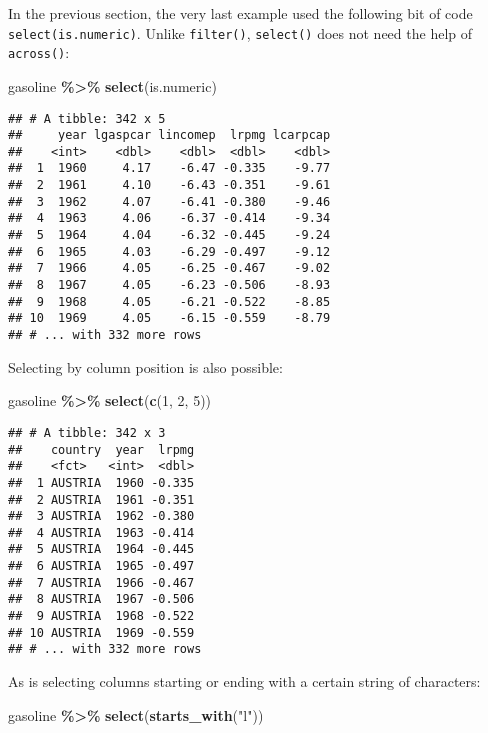 \documentclass[
]{article}
\newenvironment{Shaded}{\begin{snugshade}}{\end{snugshade}}
\newcommand{\DecValTok}[1]{\textcolor[rgb]{0.00,0.00,0.81}{#1}}
\newcommand{\KeywordTok}[1]{\textcolor[rgb]{0.13,0.29,0.53}{\textbf{#1}}}
\newcommand{\NormalTok}[1]{#1}
\newcommand{\OperatorTok}[1]{\textcolor[rgb]{0.81,0.36,0.00}{\textbf{#1}}}
\newcommand{\StringTok}[1]{\textcolor[rgb]{0.31,0.60,0.02}{#1}}
\begin{document}
In the previous section, the very last example used the following bit of code \texttt{select(is.numeric)}.
Unlike \texttt{filter()}, \texttt{select()} does not need the help of \texttt{across()}:

\begin{Shaded}
\begin{Highlighting}[]
\NormalTok{gasoline }\OperatorTok{\%\textgreater{}\%}
\StringTok{  }\KeywordTok{select}\NormalTok{(is.numeric)}
\end{Highlighting}
\end{Shaded}

\begin{verbatim}
## # A tibble: 342 x 5
##     year lgaspcar lincomep  lrpmg lcarpcap
##    <int>    <dbl>    <dbl>  <dbl>    <dbl>
##  1  1960     4.17    -6.47 -0.335    -9.77
##  2  1961     4.10    -6.43 -0.351    -9.61
##  3  1962     4.07    -6.41 -0.380    -9.46
##  4  1963     4.06    -6.37 -0.414    -9.34
##  5  1964     4.04    -6.32 -0.445    -9.24
##  6  1965     4.03    -6.29 -0.497    -9.12
##  7  1966     4.05    -6.25 -0.467    -9.02
##  8  1967     4.05    -6.23 -0.506    -8.93
##  9  1968     4.05    -6.21 -0.522    -8.85
## 10  1969     4.05    -6.15 -0.559    -8.79
## # ... with 332 more rows
\end{verbatim}

Selecting by column position is also possible:

\begin{Shaded}
\begin{Highlighting}[]
\NormalTok{gasoline }\OperatorTok{\%\textgreater{}\%}
\StringTok{  }\KeywordTok{select}\NormalTok{(}\KeywordTok{c}\NormalTok{(}\DecValTok{1}\NormalTok{, }\DecValTok{2}\NormalTok{, }\DecValTok{5}\NormalTok{))}
\end{Highlighting}
\end{Shaded}

\begin{verbatim}
## # A tibble: 342 x 3
##    country  year  lrpmg
##    <fct>   <int>  <dbl>
##  1 AUSTRIA  1960 -0.335
##  2 AUSTRIA  1961 -0.351
##  3 AUSTRIA  1962 -0.380
##  4 AUSTRIA  1963 -0.414
##  5 AUSTRIA  1964 -0.445
##  6 AUSTRIA  1965 -0.497
##  7 AUSTRIA  1966 -0.467
##  8 AUSTRIA  1967 -0.506
##  9 AUSTRIA  1968 -0.522
## 10 AUSTRIA  1969 -0.559
## # ... with 332 more rows
\end{verbatim}

As is selecting columns starting or ending with a certain string of characters:

\begin{Shaded}
\begin{Highlighting}[]
\NormalTok{gasoline }\OperatorTok{\%\textgreater{}\%}
\StringTok{  }\KeywordTok{select}\NormalTok{(}\KeywordTok{starts\_with}\NormalTok{(}\StringTok{"l"}\NormalTok{))}
\end{Highlighting}
\end{Shaded}
\end{document}
